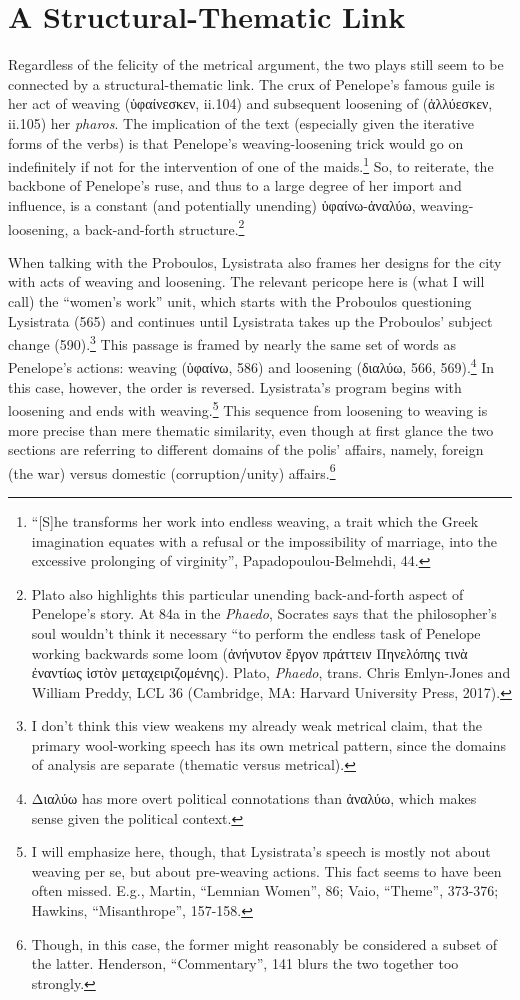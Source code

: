 \documentclass[12pt]{article}
\begin{document}
\section{A Structural-Thematic Link}

Regardless of the felicity of the metrical argument, the two plays still seem to be connected by a structural-thematic link. The crux of Penelope's famous guile is her act of weaving (ὑφαίνεσκεν, ii.104) and subsequent loosening of (ἀλλύεσκεν, ii.105) her \textit{pharos}. The implication of the text (especially given the iterative forms of the verbs) is that Penelope's weaving-loosening trick would go on indefinitely if not for the intervention of one of the maids.\footnote{``[S]he transforms her work into endless weaving, a trait which the Greek imagination equates with a refusal or the impossibility of marriage, into the excessive prolonging of virginity'', Papadopoulou-Belmehdi, 44.} So, to reiterate, the backbone of Penelope's ruse, and thus to a large degree of her import and influence, is a constant (and potentially unending) ὑφαίνω-ἀναλύω, weaving-loosening, a back-and-forth structure.\footnote{Plato also highlights this particular unending back-and-forth aspect of Penelope's story. At 84a in the \textit{Phaedo}, Socrates says that the philosopher's soul wouldn't think it necessary ``to perform the endless task of Penelope working backwards some loom (ἀνήνυτον ἔργον πράττειν Πηνελόπης τινὰ ἐναντίως ἱστὸν μεταχειριζομένης). Plato, \textit{Phaedo}, trans. Chris Emlyn-Jones and William Preddy, LCL 36 (Cambridge, MA: Harvard University Press, 2017).}

When talking with the Proboulos, Lysistrata also frames her designs for the city with acts of weaving and loosening. The relevant pericope here is (what I will call) the ``women's work'' unit, which starts with the Proboulos questioning Lysistrata (565) and continues until Lysistrata takes up the Proboulos' subject change (590).\footnote{I don't think this view weakens my already weak metrical claim, that the primary wool-working speech has its own metrical pattern, since the domains of analysis are separate (thematic versus metrical).} This passage is framed by nearly the same set of words as Penelope's actions: weaving (ὑφαίνω, 586) and loosening (διαλύω, 566, 569).\footnote{Διαλύω has more overt political connotations than ἀναλύω, which makes sense given the political context.} In this case, however, the order is reversed. Lysistrata's program begins with loosening and ends with weaving.\footnote{I will emphasize here, though, that Lysistrata's speech is mostly not about weaving per se, but about pre-weaving actions. This fact seems to have been often missed. E.g., Martin, ``Lemnian Women'', 86; Vaio, ``Theme'', 373-376;  Hawkins, ``Misanthrope'', 157-158.} This sequence from loosening to weaving is more precise than mere thematic similarity, even though at first glance the two sections are referring to different domains of the polis' affairs, namely, foreign (the war) versus domestic (corruption/unity) affairs.\footnote{Though, in this case, the former might reasonably be considered a subset of the latter. Henderson, ``Commentary'', 141 blurs the two together too strongly.}
\end{document}
